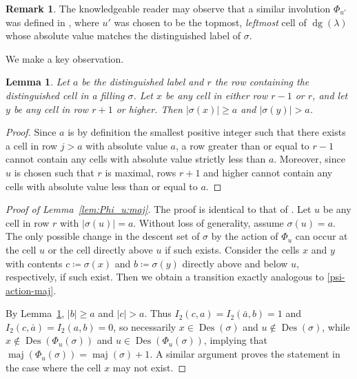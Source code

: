 \documentclass[11pt]{article}
\newtheorem{lemma}[theo]{Lemma}
\theoremstyle{definition}
\newtheorem{remark}[theo]{Remark}
\numberwithin{equation}{section}
\DeclareMathOperator{\dg}{dg}
\DeclareMathOperator{\maj}{maj}
\DeclareMathOperator{\Des}{Des}
\begin{document}
\begin{remark} 
The knowledgeable reader may observe that a similar involution $\Phi_{u'}$ was
defined in \cite[Section 5.2]{HHL05}, where $u'$ was chosen to be the topmost, \emph{leftmost} cell of $\dg(\lambda)$ whose absolute value matches the distinguished label of $\sigma$. 
\end{remark}


We make a key observation. 
\begin{lemma}\label{lem:obs}
Let $a$ be the distinguished label and $r$ the row containing the distinguished cell in a filling $\sigma$. Let $x$ be any cell in either row $r-1$ or $r$, and let $y$ be any cell in row $r+1$ or higher. Then $|\sigma(x)|\geq a$ and $|\sigma(y)|>a$.
\end{lemma}
\begin{proof}
Since $a$ is by definition the smallest positive integer such that there exists a cell in row $j>a$ with absolute value $a$, a row greater than or equal to $r-1$ cannot contain any cells with absolute value strictly less than $a$. Moreover, since $u$ is chosen such that $r$ is maximal, rows $r+1$ and higher cannot contain any cells with absolute value less than or equal to $a$. 
\end{proof}

\begin{proof}[Proof of Lemma~\ref{lem:Phi_u:maj}]
The proof is identical to that of \cite[Lemma 5.2]{HHL05}. Let $u$ be any cell in row $r$ with $|\sigma(u)|=a$. Without loss of generality, assume $\sigma(u)=a$. The only possible change in the descent set of $\sigma$ by the action of $\Phi_u$ can occur at the cell $u$ or the cell directly above $u$ if such exists. 
Consider the cells $x$ and $y$ with contents $c\coloneqq\sigma(x)$ and $b\coloneqq\sigma(y)$ directly above and below $u$, respectively, if such exist. 
Then we obtain a transition exactly analogous to \eqref{psi-action-maj}.

By Lemma~\ref{lem:obs}, $|b| \geq a$ and $|c| > a$. Thus $I_2(c,a)=I_2(\bar{a},b)=1$ and $I_2(c,\bar{a})=I_2(a,b)=0$, so necessarily $x\in\Des(\sigma)$ and $u\not\in\Des(\sigma)$, while $x\not\in\Des(\Phi_u(\sigma))$ and $u\in\Des(\Phi_u(\sigma))$, implying that $\maj(\Phi_u(\sigma))=\maj(\sigma)+1$. A similar argument proves the statement in the case where the cell $x$ may not exist.
\end{proof}
\end{document}
